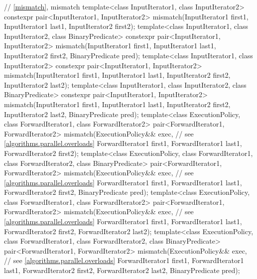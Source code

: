 \begin{codeblock}
{  // \ref{mismatch}, mismatch
  template<class InputIterator1, class InputIterator2>
    constexpr pair<InputIterator1, InputIterator2>
      mismatch(InputIterator1 first1, InputIterator1 last1,
               InputIterator2 first2);
  template<class InputIterator1, class InputIterator2, class BinaryPredicate>
    constexpr pair<InputIterator1, InputIterator2>
      mismatch(InputIterator1 first1, InputIterator1 last1,
               InputIterator2 first2, BinaryPredicate pred);
  template<class InputIterator1, class InputIterator2>
    constexpr pair<InputIterator1, InputIterator2>
      mismatch(InputIterator1 first1, InputIterator1 last1,
               InputIterator2 first2, InputIterator2 last2);
  template<class InputIterator1, class InputIterator2, class BinaryPredicate>
    constexpr pair<InputIterator1, InputIterator2>
      mismatch(InputIterator1 first1, InputIterator1 last1,
               InputIterator2 first2, InputIterator2 last2,
               BinaryPredicate pred);
  template<class ExecutionPolicy, class ForwardIterator1, class ForwardIterator2>
    pair<ForwardIterator1, ForwardIterator2>
      mismatch(ExecutionPolicy&& exec, // see \ref{algorithms.parallel.overloads}
               ForwardIterator1 first1, ForwardIterator1 last1,
               ForwardIterator2 first2);
  template<class ExecutionPolicy, class ForwardIterator1, class ForwardIterator2,
           class BinaryPredicate>
    pair<ForwardIterator1, ForwardIterator2>
      mismatch(ExecutionPolicy&& exec, // see \ref{algorithms.parallel.overloads}
               ForwardIterator1 first1, ForwardIterator1 last1,
               ForwardIterator2 first2, BinaryPredicate pred);
  template<class ExecutionPolicy, class ForwardIterator1, class ForwardIterator2>
    pair<ForwardIterator1, ForwardIterator2>
      mismatch(ExecutionPolicy&& exec, // see \ref{algorithms.parallel.overloads}
               ForwardIterator1 first1, ForwardIterator1 last1,
               ForwardIterator2 first2, ForwardIterator2 last2);
  template<class ExecutionPolicy, class ForwardIterator1, class ForwardIterator2,
           class BinaryPredicate>
    pair<ForwardIterator1, ForwardIterator2>
      mismatch(ExecutionPolicy&& exec, // see \ref{algorithms.parallel.overloads}
               ForwardIterator1 first1, ForwardIterator1 last1,
               ForwardIterator2 first2, ForwardIterator2 last2,
               BinaryPredicate pred);

}
\end{codeblock}
